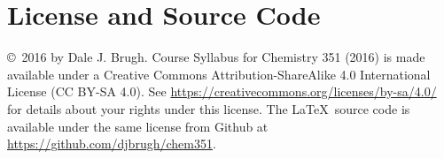 \documentclass[letterpaper,oneside,onecolumn,11pt,article]{memoir}
\begin{document}
\section{License and Source Code}
\copyright\ 2016 by Dale J. Brugh. Course Syllabus for Chemistry 351 (2016) is made available under a Creative Commons Attribution-ShareAlike 4.0 International License (CC BY-SA 4.0). See \href{https://creativecommons.org/licenses/by-sa/4.0/}{https://creativecommons.org/licenses/by-sa/4.0/} for details about your rights under this license. The \LaTeX\ source code is available under the same license from Github at \href{https://github.com/djbrugh/chem351}{https://github.com/djbrugh/chem351}. 
\end{document}
